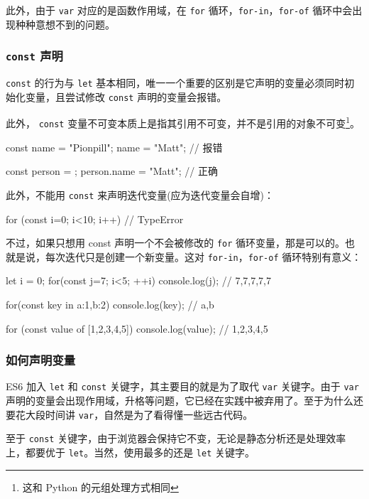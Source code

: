 此外，由于 \texttt{var} 对应的是函数作用域，在 \texttt{for} 循环，\texttt{for-in}，\texttt{for-of} 循环中会出现种种意想不到的问题。

\subsubsection{\texttt{const} 声明}

\texttt{const} 的行为与 \texttt{let} 基本相同，唯一一个重要的区别是它声明的变量必须同时初始化变量，且尝试修改 \texttt{const} 声明的变量会报错。

此外， \texttt{const} 变量不可变本质上是指其引用不可变，并不是引用的对象不可变\footnote{这和 Python 的元组处理方式相同}。

\begin{JavaScript}
const name = "Pionpill";
name = "Matt";      // 报错

const person = {};
person.name = "Matt";   // 正确
\end{JavaScript}

此外，不能用 \texttt{const} 来声明迭代变量(应为迭代变量会自增)：
\begin{JavaScript}
for (const i=0; i<10; i++) {}   // TypeError
\end{JavaScript}

不过，如果只想用 const 声明一个不会被修改的 \texttt{for} 循环变量，那是可以的。也就是说，每次迭代只是创建一个新变量。这对 \texttt{for-in}，\texttt{for-of} 循环特别有意义：

\begin{JavaScript}
let i = 0;
for(const j=7; i<5; ++i) {
    console.log(j);
}
// 7,7,7,7,7

for(const key in {a:1,b:2}) {
    console.log(key);
}
// a,b

for (const value of [1,2,3,4,5]) {
    console.log(value);
}
// 1,2,3,4,5
\end{JavaScript}

\subsubsection{如何声明变量}

ES6 加入 \texttt{let} 和 \texttt{const} 关键字，其主要目的就是为了取代 \texttt{var} 关键字。由于 \texttt{var} 声明的变量会出现作用域，升格等问题，它已经在实践中被弃用了。至于为什么还要花大段时间讲 \texttt{var}，自然是为了看得懂一些远古代码。

至于 \texttt{const} 关键字，由于浏览器会保持它不变，无论是静态分析还是处理效率上，都要优于 \texttt{let}。当然，使用最多的还是 \texttt{let} 关键字。

